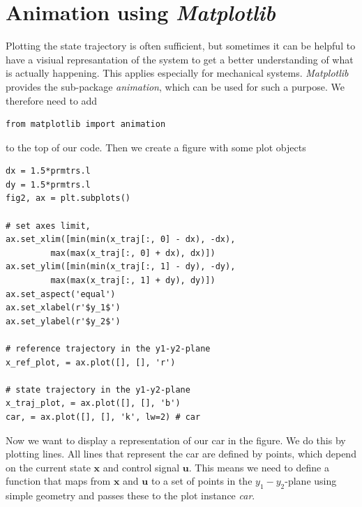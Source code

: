 \documentclass{article}
\newcommand{\mpl}{\emph{Matplotlib}\,}
\begin{document}
\newpage
\section{Animation using \mpl}
\label{sec:animation}
Plotting the state trajectory is often sufficient, but sometimes it can be helpful to have a visiual represantation of the system to get a better understanding of what is actually happening. This applies especially for mechanical systems.
\mpl provides the sub-package \emph{animation}, which can be used for such a purpose. We therefore need to add 
\begin{lstlisting}
from matplotlib import animation
\end{lstlisting}
to the top of our code. Then we create a figure with some plot objects
\begin{lstlisting}
dx = 1.5*prmtrs.l
dy = 1.5*prmtrs.l
fig2, ax = plt.subplots()
    
# set axes limit, 
ax.set_xlim([min(min(x_traj[:, 0] - dx), -dx), 
         max(max(x_traj[:, 0] + dx), dx)])
ax.set_ylim([min(min(x_traj[:, 1] - dy), -dy), 
         max(max(x_traj[:, 1] + dy), dy)])
ax.set_aspect('equal')
ax.set_xlabel(r'$y_1$')
ax.set_ylabel(r'$y_2$')

# reference trajectory in the y1-y2-plane
x_ref_plot, = ax.plot([], [], 'r') 

# state trajectory in the y1-y2-plane
x_traj_plot, = ax.plot([], [], 'b') 
car, = ax.plot([], [], 'k', lw=2) # car
\end{lstlisting}
Now we want to display a representation of our car in the figure. We do this by plotting lines. All lines that represent the car are defined by points, which depend on the current state $\mathbf{x}$ and control signal $\mathbf{u}$. This means we need to define a function that maps from $\mathbf{x}$ and $\mathbf{u}$ to a set of points in the $y_1-y_2$-plane using simple geometry and passes these to the plot instance \emph{car}.
\end{document}

